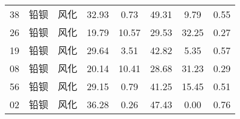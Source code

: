 \documentclass[withoutpreface,bwprint]{cumcmthesis} %
\begin{document}
\begin{appendices}
\begin{table}[!h]
\begin{tabular}{@{}cccccccc@{}}
		38                                                        & 铅钡          & 风化                                                       & 32.93                                                          & 0.73                                                         & 49.31                                                        & 9.79                                                         & 0.55                                                            \\
		26                                                        & 铅钡          & 风化                                                       & 19.79                                                          & 10.57                                                        & 29.53                                                        & 32.25                                                        & 0.27                                                            \\
		19                                                        & 铅钡          & 风化                                                       & 29.64                                                          & 3.51                                                         & 42.82                                                        & 5.35                                                         & 0.57                                                            \\
		08                                                        & 铅钡          & 风化                                                       & 20.14                                                          & 10.41                                                        & 28.68                                                        & 31.23                                                        & 0.29                                                            \\
		56                                                        & 铅钡          & 风化                                                       & 29.15                                                          & 0.79                                                         & 41.25                                                        & 15.45                                                        & 0.51                                                            \\
		02                                                        & 铅钡          & 风化                                                       & 36.28                                                          & 0.26                                                         & 47.43                                                        & 0.00                                                         & 0.76                                                            \\

\end{tabular}
\end{table}
\end{appendices}
\end{document}
